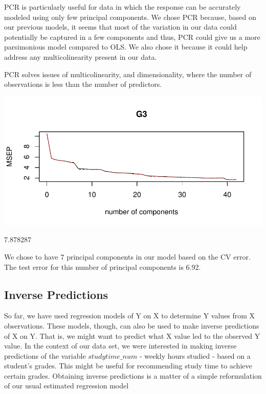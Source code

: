 \documentclass{article}
\begin{document}
PCR is particularly useful for data in which the response can be accurately modeled using only few principal components. We chose PCR because, based on our previous models, it seems that most of the variation in our data could potentially be captured in a few components and thus, PCR could give us a more parsimonious model compared to OLS. We also chose it because it could help address any multicolinearity present in our data.

PCR solves issues of multicolinearity, and dimensionality, where the number of observations is less than the number of predictors. 

\includegraphics{Report_4-013}


\begin{Schunk}
\begin{Soutput}
[1] 7.878287
\end{Soutput}
\end{Schunk}


We chose to have 7 principal components in our model based on the CV error. The test error for this number of principal components is 6.92.

\subsection{Inverse Predictions}

So far, we have used regression models of Y on X to determine Y values from X observations. These models, though, can also be used to make inverse predictions of X on Y. That is, we might want to predict what X value led to the observed Y value. In the context of our data set, we were interested in making inverse predictions of the variable $studytime\_num$ - weekly hours studied - based on a student's grades. This might be useful for recommending study time to achieve certain grades. Obtaining inverse predictions is a matter of a simple reformulation of our usual estimated regression model
\end{document}
